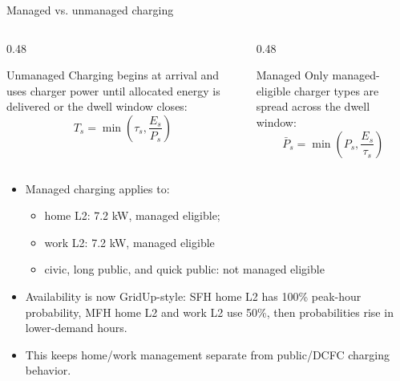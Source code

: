 \documentclass[aspectratio=169]{beamer}
\begin{document}
\begin{frame}{Managed vs. unmanaged charging}
\footnotesize
\begin{columns}[T,totalwidth=\linewidth]
\begin{column}{0.48\linewidth}
\begin{block}{Unmanaged}
Charging begins at arrival and uses charger power until allocated energy is delivered or the dwell window closes:
\[
T_s = \min\left(\tau_s, \frac{E_s}{P_s}\right)
\]
\end{block}
\end{column}
\begin{column}{0.48\linewidth}
\begin{block}{Managed}
Only managed-eligible charger types are spread across the dwell window:
\[
\bar{P}_s = \min\left(P_s, \frac{E_s}{\tau_s}\right)
\]
\end{block}
\end{column}
\end{columns}

\vspace{0.3em}
\begin{itemize}
  \item Managed charging applies to:
  \begin{itemize}
    \item home L2: 7.2 kW, managed eligible;
    \item work L2: 7.2 kW, managed eligible
    \item civic, long public, and quick public: not managed eligible
  \end{itemize}
  \item Availability is now GridUp-style: SFH home L2 has 100\% peak-hour probability, MFH home L2 and work L2 use 50\%, then probabilities rise in lower-demand hours.
  \item This keeps home/work management separate from public/DCFC charging behavior.
\end{itemize}
\end{frame}
\end{document}
